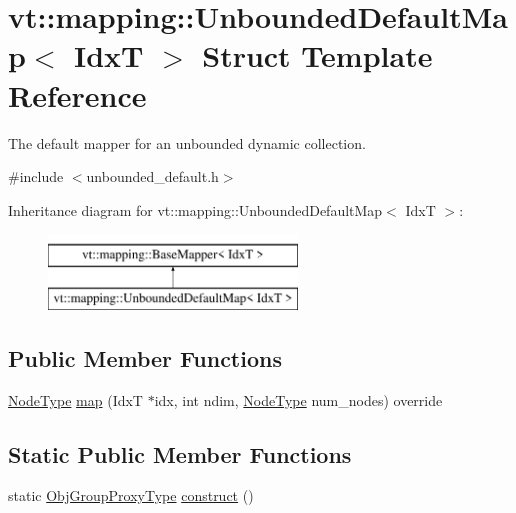 \hypertarget{structvt_1_1mapping_1_1_unbounded_default_map}{}\section{vt\+:\+:mapping\+:\+:Unbounded\+Default\+Map$<$ IdxT $>$ Struct Template Reference}
\label{structvt_1_1mapping_1_1_unbounded_default_map}


The default mapper for an unbounded dynamic collection.  




{\ttfamily \#include $<$unbounded\+\_\+default.\+h$>$}

Inheritance diagram for vt\+:\+:mapping\+:\+:Unbounded\+Default\+Map$<$ IdxT $>$\+:\begin{figure}[H]
\begin{center}
\leavevmode
\includegraphics[height=2.000000cm]{structvt_1_1mapping_1_1_unbounded_default_map}
\end{center}
\end{figure}
\subsection*{Public Member Functions}
\begin{DoxyCompactItemize}
\item 
\hyperlink{namespacevt_a866da9d0efc19c0a1ce79e9e492f47e2}{Node\+Type} \hyperlink{structvt_1_1mapping_1_1_unbounded_default_map_a8617e6a789985a7140d09a8be6bc3a47}{map} (IdxT $\ast$idx, int ndim, \hyperlink{namespacevt_a866da9d0efc19c0a1ce79e9e492f47e2}{Node\+Type} num\+\_\+nodes) override
\end{DoxyCompactItemize}
\subsection*{Static Public Member Functions}
\begin{DoxyCompactItemize}
\item 
static \hyperlink{namespacevt_ad7cae989df485fccca57f0792a880a8e}{Obj\+Group\+Proxy\+Type} \hyperlink{structvt_1_1mapping_1_1_unbounded_default_map_aeb005e2e45f45fcd17548ee10e66862b}{construct} ()
\end{DoxyCompactItemize}


